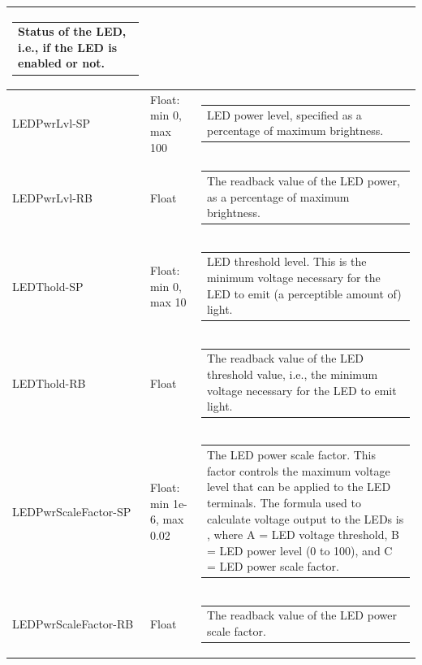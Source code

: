 \documentclass[openany]{article}
\begin{document}
\begin{longtable}{| m{4.5cm} m{2.5cm}  m{7.0cm} |}
\begin{tabular}{@{}m{6cm}@{}}
                Status of the LED, i.e., if the LED is enabled or not.
            \end{tabular} \hypertarget{pv:led-pwr-lvl}{}\\ \hline
        LEDPwrLvl-SP & Float: min 0, max 100 & \begin{tabular}{@{}m{6cm}@{}}
                LED power level, specified as a percentage of maximum brightness.
            \end{tabular} \hypertarget{}{}\\ \hline
        LEDPwrLvl-RB & Float & \begin{tabular}{@{}m{6cm}@{}}
                The readback value of the LED power, as a percentage of maximum brightness.
            \end{tabular} \hypertarget{pv:led-thold}{}\\ \hline
        LEDThold-SP & Float: min 0, max 10 & \begin{tabular}{@{}m{6cm}@{}}
                LED threshold level. This is the minimum voltage necessary for the LED to emit (a perceptible amount of) light.
            \end{tabular} \hypertarget{}{}\\ \hline
        LEDThold-RB & Float & \begin{tabular}{@{}m{6cm}@{}}
                The readback value of the LED threshold value, i.e., the minimum voltage necessary for the LED to emit light.
            \end{tabular} \hypertarget{pv:led-pwr-scale-factor}{}\\ \hline
        LEDPwrScaleFactor-SP & Float: min 1e-6, max 0.02 & \begin{tabular}{@{}m{6cm}@{}}
                The LED power scale factor. This factor controls the maximum voltage level that can be applied to the LED terminals. The formula used to calculate voltage output to the LEDs is $A.e^{B.C}$, where A = LED voltage threshold, B = LED power level (0 to 100), and C = LED power scale factor.
            \end{tabular} \hypertarget{}{}\\ \hline
        LEDPwrScaleFactor-RB & Float & \begin{tabular}{@{}m{6cm}@{}}
                The readback value of the LED power scale factor.
            \end{tabular} \hypertarget{}{}\\ \hline
    \end{longtable}
\end{document}
